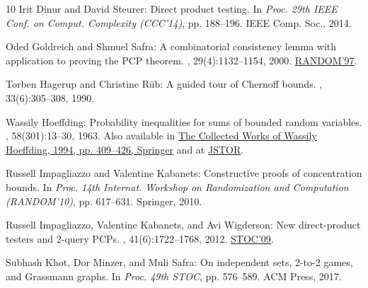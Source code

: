 \documentclass[11pt]{article}
\numberwithin{equation}{section}
\theoremstyle{definition}
\theoremstyle{plain}
\begin{document}
\begin{thebibliography}{10}
{\sc Irit Dinur and David Steurer}: Direct product testing.
\newblock In {\em Proc. 29th IEEE Conf. on Comput. Complexity (CCC'14)}, pp.
  188--196. IEEE Comp. Soc., 2014.

{\sc Oded Goldreich and Shmuel Safra}: A combinatorial consistency lemma with
  application to proving the {PCP} theorem.
, 29(4):1132--1154, 2000.
\newblock \prelim \href{https://doi.org/10.1007/3-540-63248-4\_7}{RANDOM'97}.

{\sc Torben Hagerup and Christine R{\"u}b}: A guided tour of {Chernoff} bounds.
, 33(6):305--308, 1990.
\newblock [\epfmtdoi{10.1016/0020-0190(90)90214-I}]

{\sc Wassily Hoeffding}: Probability inequalities for sums of bounded random
  variables.
, 58(301):13--30, 1963.
\newblock Also available in
  \href{https://doi.org/10.1007/978-1-4612-0865-5\_26}{The Collected Works of
  Wassily Hoeffding, 1994, pp. 409--426, Springer} and at
  \href{https://doi.org/10.2307/2282952}{JSTOR}.
\newblock [\epfmtdoi{10.1080/01621459.1963.10500830}]

{\sc Russell Impagliazzo and Valentine Kabanets}: Constructive proofs of
  concentration bounds.
\newblock In {\em Proc. 14th Internat. Workshop on Randomization and
  Computation (RANDOM'10)}, pp. 617--631. Springer, 2010.
\newblock [\epfmtdoi{10.1007/978-3-642-15369-3\_46}]

{\sc Russell Impagliazzo, Valentine Kabanets, and Avi Wigderson}: New
  direct-product testers and 2-query {PCPs}.
, 41(6):1722--1768, 2012.
\newblock \prelim \href{https://doi.org/10.1145/1536414.1536435}{STOC'09}.

{\sc Subhash Khot, Dor Minzer, and Muli Safra}: On independent sets, 2-to-2
  games, and {Grassmann} graphs.
\newblock In {\em Proc. 49th STOC}, pp. 576--589. ACM Press, 2017.


\end{thebibliography}
\end{document}
